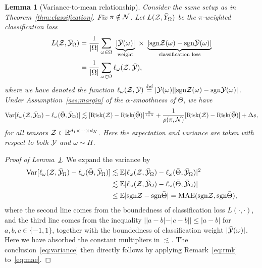 \documentclass[twoside,11pt]{article}
\theoremstyle{plain}
\newtheorem{lem}{Lemma}
\theoremstyle{definition}
\newcommand*{\KeepStyleUnderBrace}[1]{%
  \mathop{%
    \mathchoice
    {\underbrace{\displaystyle#1}}%
    {\underbrace{\textstyle#1}}%
    {\underbrace{\scriptstyle#1}}%
    {\underbrace{\scriptscriptstyle#1}}%
  }\limits
}
\def\sign{\textup{sgn}}
\begin{document}
\begin{lem}[Variance-to-mean relationship]\label{lem:variance}
Consider the same setup as in Theorem~\ref{thm:classification}. Fix $\pi\notin \mathcal{N}$. Let $L(\mathcal{Z}, \bar Y_\Omega)$ be the $\pi$-weighted classification loss
\begin{align}\label{eq:sample2}
L(\tZ, \bar \tY_\Omega)&= {1\over |\Omega|}\sum_{\omega \in \Omega}\ \KeepStyleUnderBrace{|\bar \tY(\omega)|}_{\text{weight}}\  \times \ \KeepStyleUnderBrace{| \sign \tZ(\omega)-\sign \bar \tY(\omega)|}_{\text{classification loss}}\notag \\
&={1\over |\Omega|}\sum_{\omega \in \Omega}\ell_\omega(\tZ, \bar \tY),
\end{align}
where we have denoted the function $\ell_\omega(\tZ,\bar \tY)\stackrel{\text{def}}{=}|\bar \tY(\omega)||\sign\tZ(\omega)-\sign \bar \tY(\omega)|$. Under Assumption~\ref{ass:margin} of the $\alpha$-smoothness of $\Theta$, we have
\begin{equation}\label{eq:variance}
\textup{Var}[\ell_\omega(\mathcal{Z},\bar {\mathcal{Y}}_{\Omega})-\ell_\omega(\bar \Theta, \bar {\mathcal{Y}}_\Omega)]\lesssim [\textup{Risk}(\mathcal{Z})-\textup{Risk}(\bar \Theta)]^{\alpha \over 1+\alpha}+{1\over \rho(\pi, \mathcal{N})}[\textup{Risk}(\mathcal{Z})-\textup{Risk}(\bar \Theta)]+\Delta s,
\end{equation}
for all tensors $\mathcal{Z}\in\mathbb{R}^{d_1\times \cdots \times d_K}$. Here the expectation and variance are taken with respect to both $\mathcal{Y}$ and $\omega\sim \Pi$. 
\end{lem}
\begin{proof}[Proof of Lemma~\ref{lem:variance}]
We expand the variance by
\begin{align}\label{eq:mae}
\text{Var}[\ell_\omega(\tZ,\bar \tY_\Omega)-\ell_\omega(\bar \Theta, \bar \tY_\Omega)] &\lesssim \mathbb{E}|\ell_\omega(\tZ,\bar \tY_\Omega)-\ell_\omega(\bar \Theta, \bar \tY_\Omega)|^2\notag \\
&\lesssim \mathbb{E}|\ell_\omega(\tZ,\bar \tY_\Omega)-\ell_\omega(\bar \Theta, \bar \tY_\Omega)|\notag \\
&\leq \mathbb{E}|\sign\tZ-\sign \bar \Theta| = \textup{MAE}(\sign\tZ, \sign \bar \Theta),
\end{align}
where the second line comes from the boundedness of classification loss $L(\cdot ,\cdot)$, and the third line comes from the inequality $||a-b|-|c-b||\leq |a-b|$ for $a,b,c\in\{-1,1\}$, together with the boundedness of classification weight $|\bar{\mathcal{Y}}(\omega)|$. Here we have absorbed the constant multipliers in $\lesssim$. The conclusion~\eqref{eq:variance} then directly follows by applying Remark~\ref{eq:rmk} to~\eqref{eq:mae}.
\end{proof}
\end{document}
